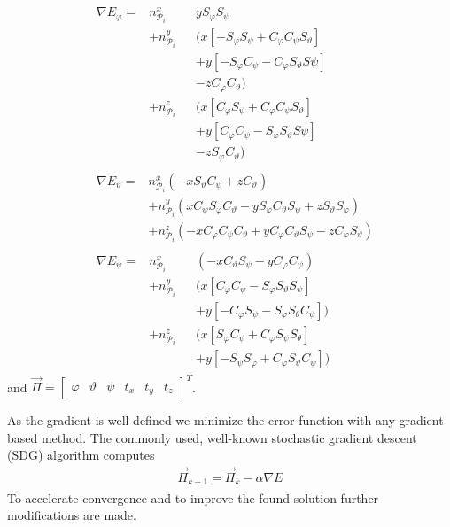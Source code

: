 \begin{align}
    &\begin{alignedat}{3}
        \nabla E_\varphi = & n_{\mathcal{P}_i}^x&&y S_\varphi S_\psi \\
        &+ n_{\mathcal{P}_i}^y&&(x[-S_\varphi S_\psi+C_\varphi C_\psi S_\vartheta] \\&&&+y[-S_\varphi C_\psi -C_\varphi S_\vartheta S\psi] \\&&&- z C_\varphi C_\vartheta)\\
        &+ n_{\mathcal{P}_i}^z&&(x[C_\varphi S_\psi+C_\varphi C_\psi S_\vartheta] \\&&&+y[C_\varphi C_\psi -S_\varphi S_\vartheta S\psi] \\&&&- z S_\varphi C_\vartheta)
    \end{alignedat} \\
    &\begin{alignedat}{3}
        \nabla E_\vartheta = & n_{\mathcal{P}_i}^x(-xS_\vartheta C_\psi + zC_\vartheta) \\
        &+ n_{\mathcal{P}_i}^y(xC_\psi S_\varphi C_\vartheta - yS_\varphi C_\vartheta S_\psi + z S_\vartheta S_\varphi)  \\
        &+ n_{\mathcal{P}_i}^z(-xC_\varphi C_\psi C_\vartheta + yC_\varphi C_\vartheta S_\psi - z C_\varphi S_\vartheta)
    \end{alignedat}\\
    &\begin{alignedat}{3}
       \nabla E_\psi =& n_{\mathcal{P}_i}^x&&\left(-xC_\vartheta S_\psi - yC_\varphi C_\psi\right) \\
       &+ n_{\mathcal{P}_i}^y&&(x[C_\varphi C_\psi - S_\varphi S_\vartheta S_\psi] \\
       &&&+ y[-C_\varphi S_\psi - S_\varphi S_\theta C_\psi]) \\
       &+ n_{\mathcal{P}_i}^z&&(x[S_\varphi C_\psi + C_\varphi S_\psi S_\theta] \\
       &&&+ y[-S_\psi S_ \varphi + C_\varphi S_\vartheta C_\psi]) 
    \end{alignedat}
\end{align}
and $\vec{\Pi}=\begin{bmatrix}\varphi & \vartheta & \psi & t_x & t_y & t_z\end{bmatrix}^T$.

As the gradient is well-defined we minimize the error function with any gradient based method. 
The commonly used, well-known stochastic gradient descent (SDG) algorithm computes 
\begin{align}
    \vec{\Pi}_{k+1} = \vec{\Pi}_{k} - \alpha \nabla E
\end{align}
To accelerate convergence and to improve the found solution further modifications are made.

